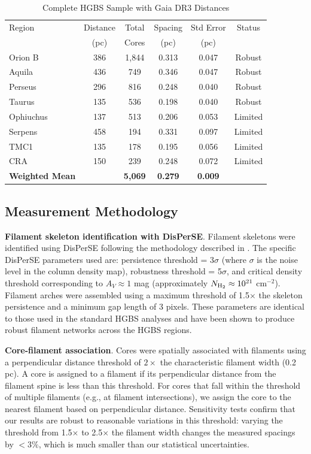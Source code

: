 \documentclass[twoside,twocolumn]{mnras}
\begin{document}
\begin{table}
\caption{Complete HGBS Sample with Gaia DR3 Distances}
\label{tab:sample}
\begin{tabular}{lccccc}
\toprule
Region & Distance & Total & Spacing & Std Error & Status \\
       & (pc)   & Cores & (pc)   & (pc)      &  \\
\midrule
Orion B  & 386 & 1,844 & 0.313 & 0.047 & Robust \\
Aquila   & 436 & 749   & 0.346 & 0.047 & Robust \\
Perseus  & 296 & 816   & 0.248 & 0.040 & Robust \\
Taurus   & 135 & 536   & 0.198 & 0.040 & Robust \\
Ophiuchus& 137 & 513   & 0.206 & 0.053 & Limited \\
Serpens  & 458 & 194   & 0.331 & 0.097 & Limited \\
TMC1     & 135 & 178   & 0.195 & 0.056 & Limited \\
CRA      & 150 & 239   & 0.248 & 0.072 & Limited \\
\midrule
\textbf{Weighted Mean} &  & \textbf{5,069} & \textbf{0.279} & \textbf{0.009} &  \\
\bottomrule
\end{tabular}
\end{table}

\subsection{Measurement Methodology}

\textbf{Filament skeleton identification with DisPerSE}. Filament skeletons were identified using DisPerSE \citep{Sousbie2011} following the methodology described in \citet{Arzoumanian2011}. The specific DisPerSE parameters used are: persistence threshold = 3$\sigma$ (where $\sigma$ is the noise level in the column density map), robustness threshold = 5$\sigma$, and critical density threshold corresponding to $A_V \approx 1$ mag (approximately $N_{\rm H_2} \approx 10^{21}$ cm$^{-2}$). Filament arches were assembled using a maximum threshold of 1.5$\times$ the skeleton persistence and a minimum gap length of 3 pixels. These parameters are identical to those used in the standard HGBS analyses \citep{Arzoumanian2011, Konyves2015, Andre2016} and have been shown to produce robust filament networks across the HGBS regions.

\textbf{Core-filament association}. Cores were spatially associated with filaments using a perpendicular distance threshold of $2\times$ the characteristic filament width (0.2 pc). A core is assigned to a filament if its perpendicular distance from the filament spine is less than this threshold. For cores that fall within the threshold of multiple filaments (e.g., at filament intersections), we assign the core to the nearest filament based on perpendicular distance. Sensitivity tests confirm that our results are robust to reasonable variations in this threshold: varying the threshold from 1.5$\times$ to 2.5$\times$ the filament width changes the measured spacings by $<3\%$, which is much smaller than our statistical uncertainties.
\end{document}
